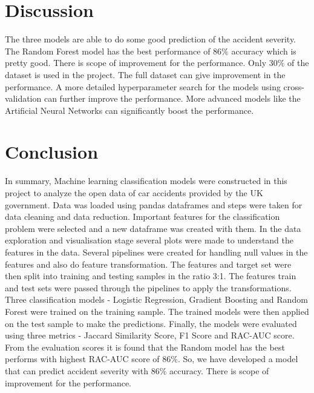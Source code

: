 \documentclass[12pt]{article}
\begin{document}
\section{ Discussion}
The three models are able to do some good prediction of the accident severity. The Random Forest model has the best performance of 86$\%$ accuracy which is pretty good. There is scope of improvement for the performance. Only 30$\%$ of the dataset is used in the project. The full dataset can give improvement in the performance. A more detailed hyperparameter search for the models using cross-validation can further improve the performance. More advanced models like the Artificial Neural Networks can significantly boost the performance.

\section{Conclusion}
In summary, Machine learning classification models were constructed in this project to analyze the open data of car accidents provided by the UK government. Data was loaded using pandas dataframes and steps were taken for data cleaning and data reduction. Important features for the classification problem were selected and a new dataframe was created with them. In the data exploration and visualisation stage several plots were made to understand the features in the data. Several pipelines were created for handling null values in the features and also do feature transformation. The features and target set were then split into training and testing samples in the ratio 3:1. The features train and test sets were passed through the pipelines to apply the transformations. Three classification models - Logistic Regression, Gradient Boosting and Random Forest were trained on the training sample. The trained models were then applied on the test sample to make the predictions. Finally, the models were evaluated using three metrics - Jaccard Similarity Score, F1 Score and RAC-AUC score. From the evaluation scores it is found that the Random model has the best performs with highest RAC-AUC score of 86$\%$. So, we have developed a model that can predict accident severity with 86$\%$ accuracy. There is scope of improvement for the performance.

\maketitle
\end{document}
